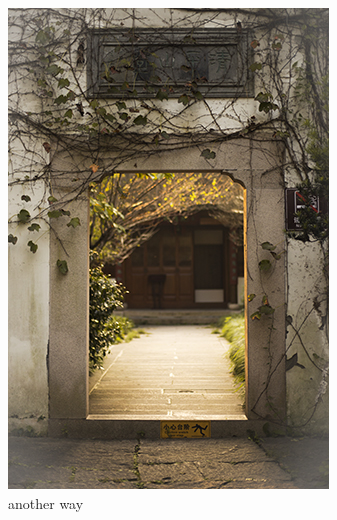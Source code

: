 \begin{figure}[htb]
	\centering 
	\includegraphics[width=\textwidth]{./Pictures/test.jpg} 
	\caption{another way} 
\end{figure}

